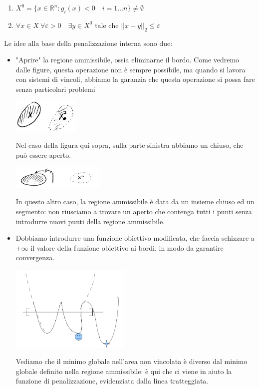 \begin{enumerate}
\item
 $X^{0}= \{ x \in \mathbb{R}^{n}: g_i(x) < 0 \quad i = 1 \ldots n \}
\neq \emptyset$

\item $\forall x \in X ~ \forall  \varepsilon > 0
\quad \exists y \in X^{0} \text{ tale che } ||x - y||_2 \leq \varepsilon$
\end{enumerate}
Le idee alla base della penalizzazione interna sono due:
\begin{itemize}
 \item "Aprire" la regione ammissibile, ossia eliminarne il bordo.
       Come vedremo dalle figure, questa operazione non \`e sempre possibile,
       ma quando si lavora con sistemi di vincoli, abbiamo la garanzia
       che questa operazione si possa fare senza particolari problemi
 \begin{center}
    \includegraphics[width=0.25\textwidth]{imgs/ottvinc06.png}
  \end{center}
  Nel caso della figura qui sopra, sulla parte sinistra abbiamo un chiuso,
  che pu\`o essere aperto.
  \begin{center}
    \includegraphics[width=0.35\textwidth]{imgs/ottvinc07.png}
  \end{center}
  In questo altro caso, la regione ammissibile \`e data da un insieme
  chiuso ed un segmento: non riusciamo a trovare un aperto che contenga
  tutti i punti senza introdurre nuovi punti della regione ammissibile.
 
 \item Dobbiamo introdurre una funzione obiettivo modificata, 
   che faccia schizzare a $+\infty$ il valore della funzione obiettivo
   ai bordi, in modo da garantire convergenza.
  \begin{center}
    \includegraphics[width=0.45\textwidth]{imgs/penint.png}
  \end{center}
  Vediamo che il minimo globale nell'area non vincolata \`e diverso
  dal minimo globale definito nella regione ammissibile: \`e qui
  che ci viene in aiuto la funzione di penalizzazione, evidenziata
  dalla linea tratteggiata.

\end{itemize}

